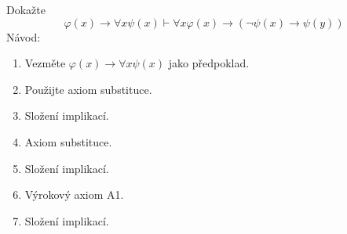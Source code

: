 Dokažte 
$$\varphi(x) \rightarrow \forall x \psi(x) \vdash \forall x \varphi(x)
\rightarrow (\neg \psi(x) \rightarrow \psi(y))$$
Návod:
\begin{enumerate}[1)]
  \item Vezměte $\varphi(x) \rightarrow \forall x \psi(x)$ jako předpoklad.
  \item Použijte axiom substituce.
  \item Složení implikací.
  \item Axiom substituce.
  \item Složení implikací.
  \item Výrokový axiom A1.
  \item Složení implikací.
\end{enumerate}
